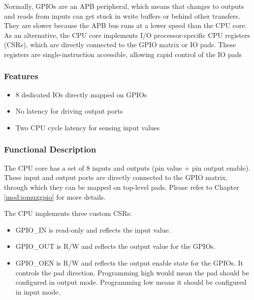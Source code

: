 \documentclass[main\_\_EN.tex]{subfiles}
\begin{document}
Normally, GPIOs are an APB peripheral, which means that changes to outputs and reads from inputs can get stuck in write buffers or behind other transfers. They are slower because the APB bus runs at a lower speed than the CPU core.
As an alternative, the CPU core implements I/O processor-specific CPU registers (CSRs), which are directly connected to the GPIO matrix or IO pads. These registers are single-instruction accessible, allowing rapid control of the IO pads

\subsubsection{Features}
\label{sec:riscvcpu-fastio-features}
 \begin{itemize}
    \item 8 dedicated IOs directly mapped on GPIOs
    \item No latency for driving output ports
    \item Two CPU cycle latency for sensing input values
\end{itemize}

\subsubsection{Functional Description}
\label{sec:riscvcpu-fastio-func-descr}

The CPU core has a set of 8 inputs and outputs (pin value + pin output enable). These input and output ports are directly connected to the GPIO matrix, through which they can be mapped on top-level pads. Please refer to Chapter \ref{mod:iomuxgpio} \textit{} for more details.

The CPU implements three custom CSRs:
\begin{itemize}
    \item GPIO\_IN is read-only and reflects the input value.
    \item GPIO\_OUT is R/W and reflects the output value for the GPIOs.
    \item GPIO\_OEN is R/W and reflects the output enable state for the GPIOs. It controls the pad direction. Programming high would mean the pad should be configured in output mode. Programming low means it should be configured in input mode.
\end{itemize}


\newpage
\hypertarget{riscvcpu-fastio-reg-summ}{}
\end{document}
